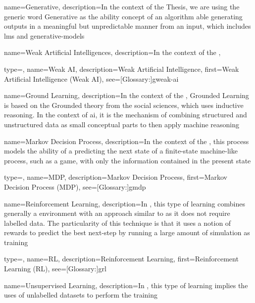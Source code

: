 {
  name={Generative},
  description={In the context of the Thesis, we are using the generic word Generative as the ability concept of an algorithm able generating outputs in a meaningful but unpredictable manner from an input, which includes \glspl{lm} and \glspl{generative-model}}
}

{
  name={Weak Artificial Intelligences},
  description={In the context of the , }
}

{
  type=\acronymtype,
  name={Weak AI},
  description={Weak Artificial Intelligence},
  first={Weak Artificial Intelligence (Weak AI)},
  see=[Glossary:]{gweak-ai}
}

{
  name={Ground Learning},
  description={In the context of the , Grounded Learning is based on the Grounded theory from the social sciences, which uses inductive reasoning. In the context of \gls{ai}, it is the mechanism of combining structured and unstructured data as small conceptual parts to then apply machine reasoning}
}


{
  name={Markov Decision Process},
  description={In the context of the , this process models the ability of a predicting the next state of a finite-state machine-like process, such as a game, with only the information contained in the present state}
}

{
  type=\acronymtype,
  name={MDP},
  description={Markov Decision Process},
  first={Markov Decision Process (MDP)},
  see=[Glossary:]{gmdp}
}

{
  name={Reinforcement Learning},
  description={In , this type of learning combines generally a  environment with an approach similar to  as it does not require labelled data. The particularity of this technique is that it uses a notion of rewards to predict the best next-step by running a large amount of simulation as training}
}

{
  type=\acronymtype,
  name={RL},
  description={Reinforcement Learning},
  first={Reinforcement Learning (RL)},
  see=[Glossary:]{grl}
}

{
  name={Unsupervised Learning},
  description={In , this type of learning implies the uses of unlabelled datasets to perform the training}
}

